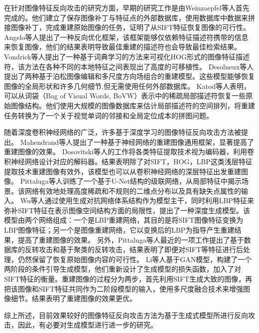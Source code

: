 在针对图像特征反向攻击的研究方面，早期的研究工作是由Weinzaepfel\cite{5995616}等人首先完成的。他们建立了保存图像补丁与特征点的外部数据库，使用数据库中数据来拼接图像补丁，完成重建原始图像的任务，证明了从SIFT特征恢复图像的可行性。
Angelo\cite{6460288}等人提出了一种反向优化框架，该框架能够仅依赖特征描述符携带的信息来恢复图像，他们的结果表明导致最佳重建的描述符也会导致最佳检索结果。
Vondrick\cite{Vondrick_2013_ICCV}等人提出了一种基于词典学习的方法来可视化HOG形式的图像特征描述符，该方法在各种不同的本地特征之间表现出了高度的可移植性。
Desolneux\cite{10.1007/978-3-319-58771-4_11}等人提出了两种基于泊松图像编辑和多尺度方向场组合的重建模型。这些模型能够恢复图像的全局形状和许多几何细节,但无需使用任何外部数据库。
Katod\cite{Kato_2014_CVPR}等人表明，可以从词袋（Bag of Visual Words, BoVW）表示中的稀疏局部描述符恢复一些原始图像结构。他们使用大规模的图像数据库来估计局部描述符的空间排列，将重建任务转换为了一个关于视觉单词的邻接和全局定位成本的拼图问题。
\par
随着深度卷积神经网络的广泛，许多基于深度学习的图像特征反向攻击方法被提出。
Mahendrand\cite{Mahendran_2015_CVPR}等人提出了一种基于神经网络的重建图像通用框架，显著提高了重建图像的效果。
Dosovitski\cite{Dosovitskiy_2016_CVPR}等人的工作将各类特征提取技术视为编码器，利用卷积神经网络设计对应的解码器。结果表明除了对SIFT，HOG，LBP这类浅层特征提取技术重建图像有效外，该模型也可以从卷积神经网络的深层特征出发重建图像。
Pittaluga\cite{Pittaluga_2019_CVPR}等人训练了一个基于U-Net结构的级联网络，从局部特征中揭示场景。该网络有效地处理高度稀疏和不规则的二维点分布以及具有缺失点属性的输入。
Wu\cite{9393327}等人通过使用生成对抗网络体系结构作为模型主干，同时利用LBP特征来弥补SIFT特征在表示图像空间结构方面的局限性，提出了一种深度生成模型。该模型由两个网络组成：一个是LBP重建网络，其目的是将SIFT图像特征变换为LBP图像特征；另一个是图像重建网络，它以变换后的LBP为指导产生重建结果，提高了重建图像的效果。
另外，Pittaluga\cite{Pittaluga_2023_ICCV}等人最近的一项工作提出了基于数据库的反转攻击和基于聚类的反转攻击，结果表明了即便对SIFT等特征进行后处理，仍然保留了恢复原始图像内容的可行性。
Li\cite{liDeepReverseAttack2024}等人基于GAN模型，构建了一个两阶段的条件引导生成模型，他们重新设计了生成模型的损失函数，加入了对SIFT特征的衡量。重建图像的过程分为两步，首先利用SIFT生成大致的图像，再把该图像和SIFT特征共同作为二阶段模型的输入，使用多尺度融合技术来增强图像细节。结果表明了重建图像的效果更优。
\par
综上所述，目前效果较好的图像特征反向攻击方法为基于生成式模型所进行反向攻击，因此，有必要对生成模型进行进一步的研究。
